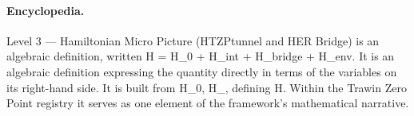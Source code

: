 \paragraph{Encyclopedia.}
Level 3 — Hamiltonian Micro Picture (HTZPtunnel and HER Bridge) is an algebraic definition, written H = H\_0 + H\_int + H\_bridge + H\_env. It is an algebraic definition expressing the quantity directly in terms of the variables on its right-hand side. It is built from H\_0, H\_, defining H. Within the Trawin Zero Point registry it serves as one element of the framework's mathematical narrative.
